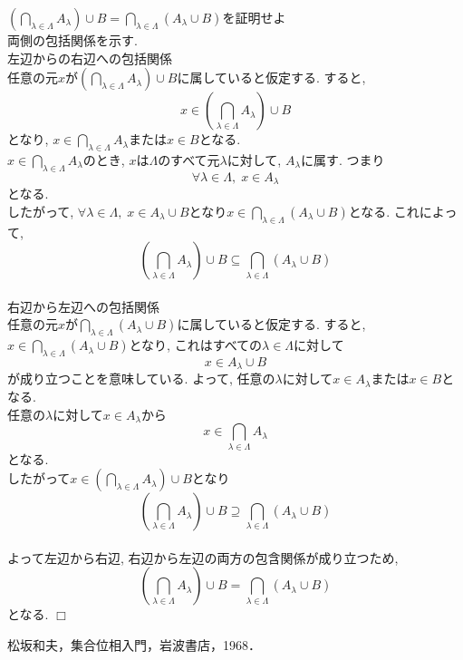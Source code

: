 \documentclass[a4j]{jsarticle}
\def \QED{\hfill $\Box$}%
\begin{document}
$\left( \bigcap_{\lambda \in \Lambda}A_\lambda \right) \cup B = \bigcap_{\lambda \in \Lambda}(A_\lambda \cup B)$を証明せよ\\

両側の包括関係を示す. \\

左辺からの右辺への包括関係\\
任意の元$x$が$\left( \bigcap_{\lambda \in \Lambda}A_\lambda \right) \cup B$に属していると仮定する. すると, $$x \in \left( \bigcap_{\lambda \in \Lambda}A_\lambda \right) \cup B$$となり, $x \in \bigcap_{\lambda \in \Lambda}A_\lambda$または$x \in B$となる. \\
$x \in \bigcap_{\lambda \in \Lambda}A_\lambda$のとき, $x$は$\Lambda$のすべて元$\lambda$に対して, $A_\lambda$に属す. つまり$$\forall \lambda \in \Lambda,\;x \in A_\lambda$$となる. \\
したがって, $\forall \lambda \in \Lambda,\;x \in A_\lambda \cup B$となり$x \in \bigcap_{\lambda \in \Lambda}(A_\lambda \cup B)$となる.
これによって, $$\left( \bigcap_{\lambda \in \Lambda}A_\lambda \right) \cup B \subseteq \bigcap_{\lambda \in \Lambda}(A_\lambda \cup B)$$\\

右辺から左辺への包括関係\\
任意の元$x$が$\bigcap_{\lambda \in \Lambda}(A_\lambda \cup B)$に属していると仮定する. すると, $x \in \bigcap_{\lambda \in \Lambda}(A_\lambda \cup B)$となり, これはすべての$\lambda \in \Lambda$に対して$$x \in A_\lambda \cup B$$が成り立つことを意味している. よって, 任意の$\lambda$に対して$x \in A_\lambda$または$x \in B$となる. \\
任意の$\lambda$に対して$x \in A_\lambda$から$$x \in \bigcap_{\lambda \in \Lambda}A_\lambda$$となる. \\
したがって$x \in \left( \bigcap_{\lambda \in \Lambda}A_\lambda \right) \cup B$となり$$\left( \bigcap_{\lambda \in \Lambda}A_\lambda \right) \cup B \supseteq \bigcap_{\lambda \in \Lambda}(A_\lambda \cup B)$$\\
よって左辺から右辺, 右辺から左辺の両方の包含関係が成り立つため, $$\left( \bigcap_{\lambda \in \Lambda}A_\lambda \right) \cup B = \bigcap_{\lambda \in \Lambda}(A_\lambda \cup B)$$となる. \QED


\begin{thebibliography}{99}
	松坂和夫，集合位相入門，岩波書店，1968．
\end{thebibliography}
\end{document}
